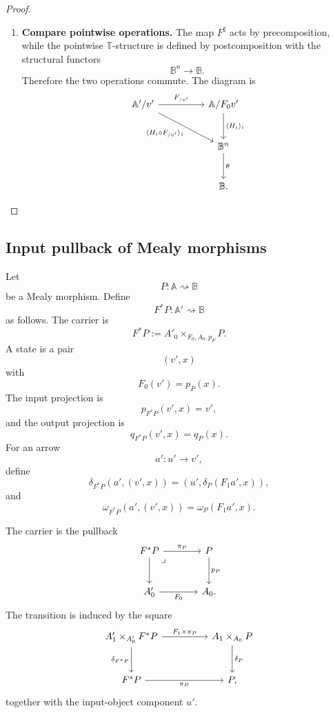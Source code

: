 \begin{proof}
\begin{enumerate}
        \item \textbf{Compare pointwise operations.}
        The map \(F^\sharp\) acts by precomposition, while the pointwise
        \(\mathbb T\)-structure is defined by postcomposition with the
        structural functors
        \[
            \mathbb B^n\to\mathbb B.
        \]
        Therefore the two operations commute. The diagram is
        \[
        \begin{tikzcd}[column sep=huge, row sep=large]
            \mathbb A'/v'
                \arrow[r, "F_{/v'}"]
                \arrow[dr, "{\langle H_i\circ F_{/v'}\rangle_i}"']
            &
            \mathbb A/F_0v'
                \arrow[d, "{\langle H_i\rangle_i}"]
            \\
            &
            \mathbb B^n
                \arrow[d, "\theta"]
            \\
            &
            \mathbb B .
        \end{tikzcd}
        \]
    \end{enumerate}
\end{proof}

\subsection{Input pullback of Mealy morphisms}
\label{subsec:input-pullback-mealy}

\begin{definition}
\label{def:input-pullback-mealy}
    Let
    \[
        P:\mathbb A\rightsquigarrow\mathbb B
    \]
    be a Mealy morphism. Define
    \[
        F^*P:\mathbb A'\rightsquigarrow\mathbb B
    \]
    as follows. The carrier is
    \[
        F^*P
        :=
        A'_0\times_{F_0,A_0,p_P}P.
    \]
    A state is a pair
    \[
        (v',x)
    \]
    with
    \[
        F_0(v')=p_P(x).
    \]
    The input projection is
    \[
        p_{F^*P}(v',x)=v',
    \]
    and the output projection is
    \[
        q_{F^*P}(v',x)=q_P(x).
    \]
    For an arrow
    \[
        a':u'\to v',
    \]
    define
    \[
        \delta_{F^*P}(a',(v',x))
        =
        (u',\delta_P(F_1a',x)),
    \]
    and
    \[
        \omega_{F^*P}(a',(v',x))
        =
        \omega_P(F_1a',x).
    \]
\end{definition}

The carrier is the pullback
\[
\begin{tikzcd}[column sep=large, row sep=large]
    F^*P
        \arrow[r, "\pi_P"]
        \arrow[d]
        \arrow[dr, phantom, "\lrcorner", very near start]
    &
    P
        \arrow[d, "p_P"]
    \\
    A'_0
        \arrow[r, "F_0"']
    &
    A_0 .
\end{tikzcd}
\]
The transition is induced by the square
\[
\begin{tikzcd}[column sep=huge, row sep=large]
    A'_1\times_{A'_0}F^*P
        \arrow[r, "{F_1\times \pi_P}"]
        \arrow[d, "\delta_{F^*P}"']
    &
    A_1\times_{A_0}P
        \arrow[d, "\delta_P"]
    \\
    F^*P
        \arrow[r, "\pi_P"']
    &
    P ,
\end{tikzcd}
\]
together with the input-object component \(u'\).

